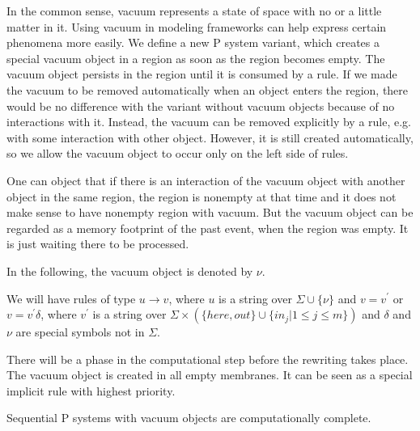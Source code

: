 In the common sense, vacuum represents a state of space with no or a little matter in it. Using vacuum in modeling frameworks can help express certain phenomena more easily. We define a new P system variant, which creates a special vacuum object in a region as soon as the region becomes empty.
The vacuum object persists in the region until it is consumed by a rule.
If we made the vacuum to be removed automatically when an object enters the region, there would be no difference with the variant without vacuum objects because of no interactions with it. Instead, the vacuum can be removed explicitly by a rule, e.g. with some interaction with other object. However, it is still created automatically, so we allow the vacuum object to occur only on the left side of rules.

One can object that if there is an interaction of the vacuum object with another object in the same region, the region is nonempty at that time and it does not make sense to have nonempty region with vacuum. But the vacuum object can be regarded as a memory footprint of the past event, when the region was empty. It is just waiting there to be processed.

In the following, the vacuum object is denoted by $\nu$.

We will have rules of type $u\rightarrow v$, where $u$ is a string over $\Sigma\cup\{\nu\}$ and $v=v^\prime$ or $v=v^\prime\delta$, where $v^\prime$ is a string over $\Sigma\times(\{here, out\}\cup\{in_j|1\leq j\leq m\})$ and $\delta$ and $\nu$ are special symbols not in $\Sigma$.

There will be a phase in the computational step before the rewriting takes place. The vacuum object is created in all empty membranes. It can be seen as a special implicit rule with highest priority.

\begin{veta}
   Sequential P systems with vacuum objects are computationally complete.
\end{veta}


